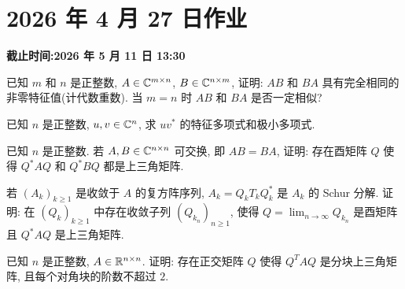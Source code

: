 \section*{2026 年 4 月 27 日作业}
{}
\noindent\textbf{截止时间:2026 年 5 月 11 日 13:30}
\setcounter{problem}{0}
\setcounter{sollemma}{0}

\begin{problem}
已知 $m$ 和 $n$ 是正整数, $A\in\mathbb{C}^{m\times n}$, $B\in\mathbb{C}^{n\times m}$, 证明: $AB$ 和 $BA$ 具有完全相同的非零特征值(计代数重数). 当 $m=n$ 时 $AB$ 和 $BA$ 是否一定相似?
\begin{solution}

\end{solution}
\end{problem}

\begin{problem}
已知 $n$ 是正整数, $u,v\in\mathbb{C}^n$, 求 $uv^*$ 的特征多项式和极小多项式.
\begin{solution}

\end{solution}
\end{problem}

\begin{problem}
已知 $n$ 是正整数. 若 $A,B\in\mathbb{C}^{n\times n}$ 可交换, 即 $AB=BA$, 证明: 存在酉矩阵 $Q$ 使得 $Q^*AQ$ 和 $Q^*BQ$ 都是上三角矩阵.
\begin{solution}

\end{solution}
\end{problem}

\begin{problem}
若 $(A_k)_{k\geq 1}$ 是收敛于 $A$ 的复方阵序列, $A_k=Q_kT_kQ_k^*$ 是 $A_k$ 的 Schur 分解. 证明: 在 $(Q_k)_{k\geq 1}$ 中存在收敛子列 $(Q_{k_n})_{n\geq 1}$, 使得 $Q=\lim_{n\to\infty}Q_{k_n}$ 是酉矩阵且 $Q^*AQ$ 是上三角矩阵.
\begin{solution}

\end{solution}
\end{problem}

\begin{problem}
已知 $n$ 是正整数, $A\in\mathbb{R}^{n\times n}$. 证明: 存在正交矩阵 $Q$ 使得 $Q^TAQ$ 是分块上三角矩阵, 且每个对角块的阶数不超过 $2$.
\begin{solution}

\end{solution}
\end{problem}

